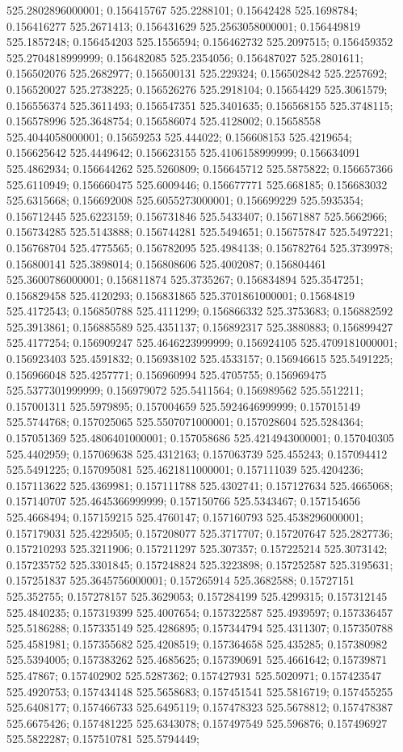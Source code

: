 525.2802896000001; 0.156415767 525.2288101; 0.15642428 525.1698784; 0.156416277 525.2671413; 0.156431629 525.2563058000001; 0.156449819 525.1857248; 0.156454203 525.1556594; 0.156462732 525.2097515; 0.156459352 525.2704818999999; 0.156482085 525.2354056; 0.156487027 525.2801611; 0.156502076 525.2682977; 0.156500131 525.229324; 0.156502842 525.2257692; 0.156520027 525.2738225; 0.156526276 525.2918104; 0.15654429 525.3061579; 0.156556374 525.3611493; 0.156547351 525.3401635; 0.156568155 525.3748115; 0.156578996 525.3648754; 0.156586074 525.4128002; 0.15658558 525.4044058000001; 0.15659253 525.444022; 0.156608153 525.4219654; 0.156625642 525.4449642; 0.156623155 525.4106158999999; 0.156634091 525.4862934; 0.156644262 525.5260809; 0.156645712 525.5875822; 0.156657366 525.6110949; 0.156660475 525.6009446; 0.156677771 525.668185; 0.156683032 525.6315668; 0.156692008 525.6055273000001; 0.156699229 525.5935354; 0.156712445 525.6223159; 0.156731846 525.5433407; 0.15671887 525.5662966; 0.156734285 525.5143888; 0.156744281 525.5494651; 0.156757847 525.5497221; 0.156768704 525.4775565; 0.156782095 525.4984138; 0.156782764 525.3739978; 0.156800141 525.3898014; 0.156808606 525.4002087; 0.156804461 525.3600786000001; 0.156811874 525.3735267; 0.156834894 525.3547251; 0.156829458 525.4120293; 0.156831865 525.3701861000001; 0.15684819 525.4172543; 0.156850788 525.4111299; 0.156866332 525.3753683; 0.156882592 525.3913861; 0.156885589 525.4351137; 0.156892317 525.3880883; 0.156899427 525.4177254; 0.156909247 525.4646223999999; 0.156924105 525.4709181000001; 0.156923403 525.4591832; 0.156938102 525.4533157; 0.156946615 525.5491225; 0.156966048 525.4257771; 0.156960994 525.4705755; 0.156969475 525.5377301999999; 0.156979072 525.5411564; 0.156989562 525.5512211; 0.157001311 525.5979895; 0.157004659 525.5924646999999; 0.157015149 525.5744768; 0.157025065 525.5507071000001; 0.157028604 525.5284364; 0.157051369 525.4806401000001; 0.157058686 525.4214943000001; 0.157040305 525.4402959; 0.157069638 525.4312163; 0.157063739 525.455243; 0.157094412 525.5491225; 0.157095081 525.4621811000001; 0.157111039 525.4204236; 0.157113622 525.4369981; 0.157111788 525.4302741; 0.157127634 525.4665068; 0.157140707 525.4645366999999; 0.157150766 525.5343467; 0.157154656 525.4668494; 0.157159215 525.4760147; 0.157160793 525.4538296000001; 0.157179031 525.4229505; 0.157208077 525.3717707; 0.157207647 525.2827736; 0.157210293 525.3211906; 0.157211297 525.307357; 0.157225214 525.3073142; 0.157235752 525.3301845; 0.157248824 525.3223898; 0.157252587 525.3195631; 0.157251837 525.3645756000001; 0.157265914 525.3682588; 0.15727151 525.352755; 0.157278157 525.3629053; 0.157284199 525.4299315; 0.157312145 525.4840235; 0.157319399 525.4007654; 0.157322587 525.4939597; 0.157336457 525.5186288; 0.157335149 525.4286895; 0.157344794 525.4311307; 0.157350788 525.4581981; 0.157355682 525.4208519; 0.157364658 525.435285; 0.157380982 525.5394005; 0.157383262 525.4685625; 0.157390691 525.4661642; 0.15739871 525.47867; 0.157402902 525.5287362; 0.157427931 525.5020971; 0.157423547 525.4920753; 0.157434148 525.5658683; 0.157451541 525.5816719; 0.157455255 525.6408177; 0.157466733 525.6495119; 0.157478323 525.5678812; 0.157478387 525.6675426; 0.157481225 525.6343078; 0.157497549 525.596876; 0.157496927 525.5822287; 0.157510781 525.5794449; 